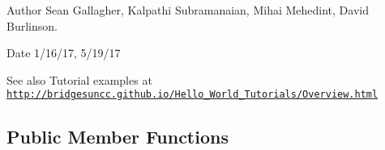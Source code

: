 \begin{DoxyAuthor}{Author}
Sean Gallagher, Kalpathi Subramanaian, Mihai Mehedint, David Burlinson.
\end{DoxyAuthor}
\begin{DoxyDate}{Date}
1/16/17, 5/19/17
\end{DoxyDate}
\begin{DoxySeeAlso}{See also}
Tutorial examples at ~\newline
 \href{http://bridgesuncc.github.io/Hello_World_Tutorials/Overview.html}{\tt http\+://bridgesuncc.\+github.\+io/\+Hello\+\_\+\+World\+\_\+\+Tutorials/\+Overview.\+html} 
\end{DoxySeeAlso}
\subsection*{Public Member Functions}

